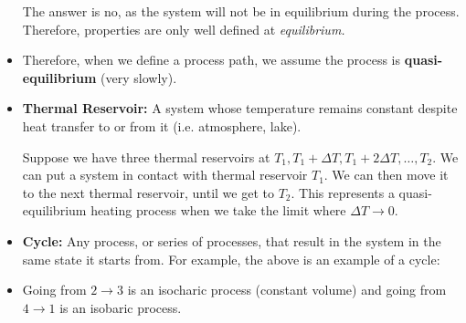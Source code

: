 \begin{itemize}
\begin{idea}
        The answer is no, as the system will not be in equilibrium during the process. Therefore, properties are only well defined at \textit{equilibrium.}
    \end{idea}
    \item Therefore, when we define a process path, we assume the process is \textbf{quasi-equilibrium} (very slowly).
    \item \textbf{Thermal Reservoir:} A system whose temperature remains constant despite heat transfer to or from it (i.e. atmosphere, lake).
    \begin{example}
        Suppose we have three thermal reservoirs at $T_1, T_1+\Delta T, T_1+2\Delta T, \dots, T_2$. We can put a system in contact with thermal reservoir $T_1$. We can then move it to the next thermal reservoir, until we get to $T_2$. This represents a quasi-equilibrium heating process when we take the limit where $\Delta T \rightarrow 0$.
    \end{example}
    \begin{center}
    \end{center}
    \item \textbf{Cycle:} Any process, or series of processes, that result in the system in the same state it starts from. For example, the above is an example of a cycle:
    \item Going from $2\rightarrow 3$ is an isocharic process (constant volume) and going from $4\rightarrow 1$ is an isobaric process.
\end{itemize}
